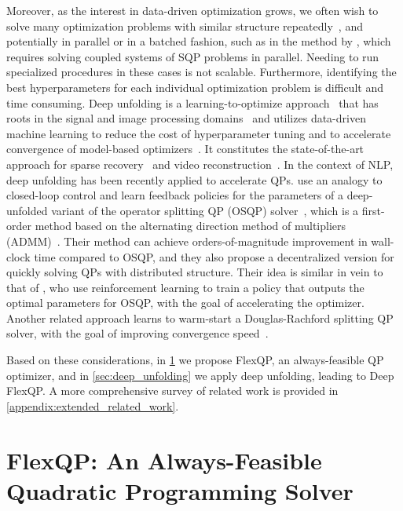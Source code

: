 \documentclass{article} %
\begin{document}
Moreover, as the interest in data-driven optimization grows, we often wish to solve many optimization problems with similar structure repeatedly~\citep{amos2023tutorial}, and potentially in parallel or in a batched fashion, such as in the method by \citet{fang2023sqp}, which requires solving coupled systems of SQP problems in parallel. Needing to run specialized procedures in these cases is not scalable. Furthermore, identifying the best hyperparameters for each individual optimization problem is difficult and time consuming.
Deep unfolding is a learning-to-optimize approach~\citep{chen2022learning} that has roots in the signal and image processing domains~\citep{gregor2010ista,wang2015deep} and utilizes data-driven machine learning to reduce the cost of hyperparameter tuning and to accelerate convergence of model-based optimizers~\citep{monga2021algorithm}. It constitutes the state-of-the-art approach for sparse recovery~\citep{liu2019alista} and video reconstruction~\citep{deweerdt2024transformer}. In the context of NLP, deep unfolding has been recently applied to accelerate QPs. \citet{saravanos2025deep} use an analogy to closed-loop control and learn feedback policies for the parameters of a deep-unfolded variant of the operator splitting QP (OSQP) solver~\citep{stellato2020osqp}, which is a first-order method based on the alternating direction method of multipliers (ADMM)~\citep{boyd2011distributed}. Their method can achieve orders-of-magnitude improvement in wall-clock time compared to OSQP, and they also propose a decentralized version for quickly solving QPs with distributed structure. Their idea is similar in vein to that of \citet{ichnowski2021accelerating}, who use reinforcement learning to train a policy that outputs the optimal parameters for OSQP, with the goal of accelerating the optimizer. Another related approach learns to warm-start a Douglas-Rachford splitting QP solver, with the goal of improving convergence speed~\citep{sambharya2023end}.

Based on these considerations, in \cref{sec:FlexQP} we propose FlexQP, an always-feasible QP optimizer, and in \cref{sec:deep_unfolding} we apply deep unfolding, leading to Deep FlexQP.
A more comprehensive survey of related work is provided in \cref{appendix:extended_related_work}.


\section{FlexQP: An Always-Feasible Quadratic Programming Solver}
\label{sec:FlexQP}
\end{document}
